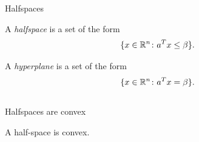 \begin{frame}{Halfspaces}

  \begin{definition}    
    A \emph{halfspace} is a set  of the form
    \begin{displaymath}
  \{ x \in \mathbb{R}^n \colon a^Tx \leq \beta\}. 
\end{displaymath}

A \emph{hyperplane} is a set of the form 
\begin{displaymath}
  \{ x \in \mathbb{R}^n \colon a^Tx = \beta\}. 
\end{displaymath} 

  \end{definition}

  
  \begin{columns}
    \begin{column}{.5\textwidth}
      
    \end{column}
    \begin{column}{.5\textwidth}
      
    \end{column}       
  \end{columns}
\end{frame}





\begin{frame}{Halfspaces are convex}
\begin{lemma}
    A half-space is convex. 
  \end{lemma}
  \begin{columns}
    \begin{column}{.5\textwidth}
      
    \end{column}
    \begin{column}{.5\textwidth}
      
    \end{column}       
  \end{columns}
\end{frame}



\begin{frame}{}

  \begin{columns}
    \begin{column}{.5\textwidth}
      
    \end{column}
    \begin{column}{.5\textwidth}
      
    \end{column}       
  \end{columns}
\end{frame}




